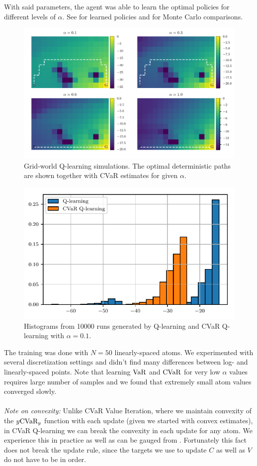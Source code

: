 With said parameters, the agent was able to learn the optimal policies for different levels of $\alpha$. See  for learned policies and  for Monte Carlo comparisons.

\begin{figure}[h]
\center
\includegraphics[width=\linewidth]{gfx/q_optimal_paths.pdf}
\caption[Grid-world CVaR Q-learning simulations.]{Grid-world Q-learning simulations. The optimal deterministic paths are shown together with CVaR estimates for given $\alpha$.}
\label{fig:qgrid}
\end{figure}


\begin{figure}[h]
\center
\includegraphics[width=0.8\linewidth]{gfx/sample_hist.pdf}
\caption[Grid-world CVaR Q-learning histograms.]{Histograms from 10000 runs generated by Q-learning and CVaR Q-learning with $\alpha=0.1$.}
\label{fig:qhist}
\end{figure}

The training was done with $N=50$ linearly-spaced atoms. We experimented with several discretization settings and didn't find many differences between log- and linearly-spaced points. Note that learning $\text{VaR}$ and $\text{CVaR}$ for very low $\alpha$ values requires large number of samples and we found that extremely small atom values converged slowly.
\\
\\
\textit{Note on convexity:} Unlike CVaR Value Iteration, where we maintain convexity of the $y\text{CVaR}_y$ function with each update (given we started with convex estimates), in CVaR Q-learning we can break the convexity in each update for any atom. We experience this in practice as well as can be gauged from . Fortunately this fact does not break the update rule, since the targets we use to update $C$ as well as $V$ do not have to be in order.



